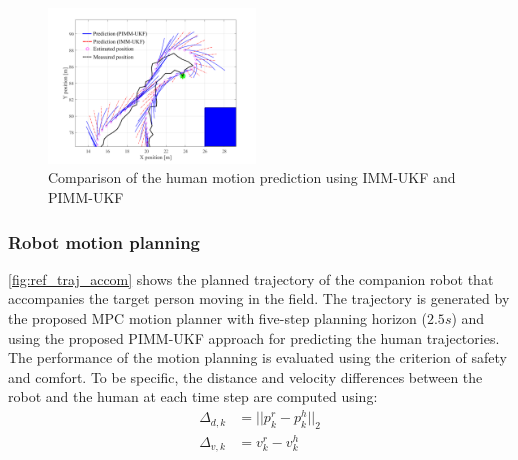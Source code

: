 \documentclass[journal]{IEEEtran}
\begin{document}
	\begin{figure}
		\centering
		\includegraphics[width=0.49\textwidth]{figures/Human_motion_prediction_zoom3}
		\caption{Comparison of the human motion prediction using IMM-UKF and PIMM-UKF}
		\label{fig:prediction_zoom1}
	\end{figure}	
    
	\subsubsection{Robot motion planning}\label{subsubsec:motion_plan}
	\cref{fig:ref_traj_accom} shows the planned trajectory of the companion robot that accompanies the target person moving in the field. The trajectory is generated by the proposed MPC motion planner with five-step planning horizon ($2.5s$) and using the proposed PIMM-UKF approach for predicting the human trajectories.
	The performance of the motion planning is evaluated using the criterion of safety and comfort.
	To be specific, the distance and velocity differences between the robot and the human at each time step are computed using:
	\begin{subequations}
		\begin{align}
			\Delta_{d,k}&=||p^r_k-p^h_k||_2\nonumber\\ 
			\Delta_{v,k}&=v^r_k-v^h_k \nonumber
		\end{align}
	\end{subequations}
    \normalsize
	
\end{document}
